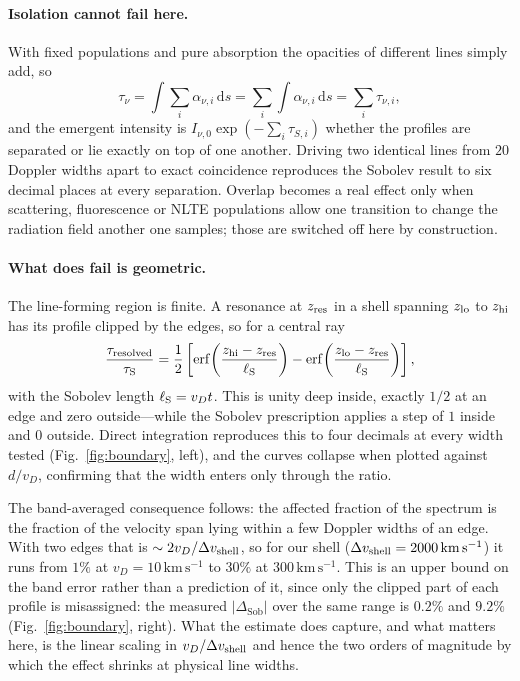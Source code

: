 \documentclass[fleqn,usenatbib]{mnras}
\newcommand{\dsobp}{\Delta_{\mathrm{Sob}}}
\newcommand{\taus}{\tau_{\mathrm{S}}}
\newcommand{\kms}{\,\mathrm{km\,s^{-1}}}
\begin{document}
\paragraph{Isolation cannot fail here.} With fixed populations and pure
absorption the opacities of different lines simply add, so
\begin{equation}
  \tau_\nu = \int \sum_i \alpha_{\nu,i}\,\mathrm{d}s
           = \sum_i \int \alpha_{\nu,i}\,\mathrm{d}s
           = \sum_i \tau_{\nu,i},
\end{equation}
and the emergent intensity is $I_{\nu,0}\exp(-\sum_i\tau_{S,i})$ whether the
profiles are separated or lie exactly on top of one another. Driving two
identical lines from $20$ Doppler widths apart to exact coincidence reproduces
the Sobolev result to six decimal places at every separation. Overlap becomes
a real effect only when scattering, fluorescence or NLTE populations allow one
transition to change the radiation field another one samples; those are
switched off here by construction.

\paragraph{What does fail is geometric.} The line-forming region is finite.
A resonance at $z_{\rm res}$ in a shell spanning $z_{\rm lo}$ to $z_{\rm hi}$
has its profile clipped by the edges, so for a central ray
\begin{equation}
  \frac{\tau_{\rm resolved}}{\taus}
  = \frac12\left[
      \mathrm{erf}\!\left(\frac{z_{\rm hi}-z_{\rm res}}{\ell_{\rm S}}\right)
    - \mathrm{erf}\!\left(\frac{z_{\rm lo}-z_{\rm res}}{\ell_{\rm S}}\right)
    \right],
\end{equation}
with the Sobolev length $\ell_{\rm S} = v_D t$. This is
unity deep inside, exactly $1/2$ at an edge and zero outside---while
the Sobolev prescription applies a step of $1$ inside and $0$ outside. Direct
integration reproduces this to four decimals at every width tested
(Fig.~\ref{fig:boundary}, left), and the curves collapse when plotted against
$d/v_D$, confirming that the width enters only through the ratio.

The band-averaged consequence follows: the affected fraction of the spectrum
is the fraction of the velocity span lying within a few Doppler widths of an
edge. With two edges that is $\sim 2v_D/\Delta v_{\rm shell}$, so for our
shell ($\Delta v_{\rm shell} = 2000\kms$) it runs from $1\%$ at
$v_D = 10\kms$ to $30\%$ at $300\kms$. This is an upper bound on the band
error rather than a prediction of it, since only the clipped part of each
profile is misassigned: the measured $|\dsobp|$ over the same range is
$0.2\%$ and $9.2\%$ (Fig.~\ref{fig:boundary}, right). What the estimate does
capture, and what matters here, is the linear scaling in
$v_D/\Delta v_{\rm shell}$ and hence the two orders of magnitude by which the
effect shrinks at physical line widths.
\end{document}
